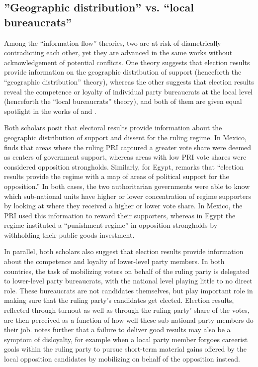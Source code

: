 \documentclass[12pt]{article}\usepackage[]{graphicx}\usepackage[]{color}
\newcommand{\1}{\mathbbm{1}}
\begin{document}
\subsection{''Geographic distribution'' vs. ``local bureaucrats''}
Among the ``information flow'' theories, two are at risk of diametrically contradicting each other, yet they are advanced in the same works without acknowledgement of potential conflicts. One theory suggests that election results provide information on the geographic distribution of support (henceforth the ``geographic distribution'' theory), whereas the other suggests that election results reveal the competence or loyalty of individual party bureaucrats at the local level (henceforth the ``local bureaucrats'' theory), and both of them are given equal spotlight in the works of \cite{Magaloni2006} and \cite{Blaydes2008}.

Both scholars posit that electoral results provide information about the geographic distribution of support and dissent for the ruling regime. In Mexico, \cite{Magaloni2006} finds that areas where the ruling PRI captured a greater vote share were deemed as centers of government support, whereas areas with low PRI vote shares were considered opposition strongholds. Similarly, for Egypt, \cite{Blaydes2008} remarks that “election results provide the regime with a map of areas of political support for the opposition.” In both cases, the two authoritarian governments were able to know which sub-national units have higher or lower concentration of regime supporters by looking at where they received a higher or lower vote share. In Mexico, the PRI used this information to reward their supporters, whereas in Egypt the regime instituted a “punishment regime” in opposition strongholds by withholding their public goods investment.

In parallel, both scholars also suggest that election results provide information about the competence and loyalty of lower-level party members. In both countries, the task of mobilizing voters on behalf of the ruling party is delegated to lower-level party bureaucrats, with the national level playing little to no direct role. These bureaucrats are not candidates themselves, but play important role in making sure that the ruling party’s candidates get elected. Election results, reflected through turnout as well as through the ruling party' share of the votes, are then perceived as a function of how well these sub-national party members do their job. \cite{Blaydes2008} notes further that a failure to deliver good results may also be a symptom of disloyalty, for example when a local party member forgoes careerist goals within the ruling party to pursue short-term material gains offered by the local opposition candidates by mobilizing on behalf of the opposition instead.
\end{document}
